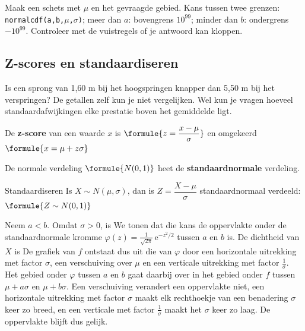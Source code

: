 \begin{werkwijze}
Maak een schets met $\mu$ en het gevraagde gebied. Kans tussen twee grenzen: \texttt{normalcdf(a,b,$\mu$,$\sigma$)}; meer dan $a$: bovengrens $10^{99}$; minder dan $b$: ondergrens $-10^{99}$. Controleer met de vuistregels of je antwoord kan kloppen.
\end{werkwijze}


\begin{oefeningen}
\end{oefeningen}

\subsection{Z-scores en standaardiseren}

Is een sprong van 1,60 m bij het hoogspringen knapper dan 5,50 m bij het verspringen? De getallen zelf kun je niet vergelijken. Wel kun je vragen hoeveel standaardafwijkingen elke prestatie boven het gemiddelde ligt.

\begin{theorie}
De \textbf{\textcolor{accent}{z-score}} van een waarde $x$ is \quad $\formule{z = \dfrac{x - \mu}{\sigma}}$ \qquad en omgekeerd \quad $\formule{x = \mu + z\sigma}$

\vspace{1mm}
De normale verdeling $\formule{N(0, 1)}$ heet de \textbf{\textcolor{accent}{standaardnormale}} verdeling.

\begin{stelling}{Standaardiseren}
Is $X \sim N(\mu, \sigma)$, dan is $Z = \dfrac{X - \mu}{\sigma}$ standaardnormaal verdeeld: \quad $\formule{Z \sim N(0, 1)}$
\end{stelling}

\begin{bewijs}
Neem $a < b$. Omdat $\sigma > 0$, is
We tonen dat die kans de oppervlakte onder de standaardnormale kromme $\varphi(z) = \frac{1}{\sqrt{2\pi}}\,\mathrm{e}^{-z^2/2}$ tussen $a$ en $b$ is. De dichtheid van $X$ is
De grafiek van $f$ ontstaat dus uit die van $\varphi$ door een horizontale uitrekking met factor $\sigma$, een verschuiving over $\mu$ en een verticale uitrekking met factor $\frac{1}{\sigma}$. Het gebied onder $\varphi$ tussen $a$ en $b$ gaat daarbij over in het gebied onder $f$ tussen $\mu + a\sigma$ en $\mu + b\sigma$. Een verschuiving verandert een oppervlakte niet, een horizontale uitrekking met factor $\sigma$ maakt elk rechthoekje van een benadering $\sigma$ keer zo breed, en een verticale met factor $\frac{1}{\sigma}$ maakt het $\sigma$ keer zo laag. De oppervlakte blijft dus gelijk.
\end{bewijs}
\end{theorie}

